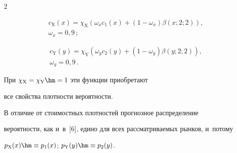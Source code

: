 \begin{multicols}{2}
  


  \vspace*{-5pt}


  


\noindent


  \begin{multline}


  c_{\mathrm{X}}(x)=\chi_{\mathrm{X}} \left( \omega_x c_1(x)+(1-


\omega_x)\beta(x;2;2)\right),\\[-0.5pt]


  \omega_x=0{,}9\,;


  \label{e22-ags}


  \end{multline}


  


  \vspace*{-14pt}


  


  \noindent


  \begin{multline}


  c_{\mathrm{Y}}(y)=\chi_{\mathrm{Y}} \left( \omega_y c_2(y)+(1-


\omega_y)\beta(y;2;2)\right),\\[-0.5pt]


  \omega_y=0{,}9\,.


  \label{e23-ags}


  \end{multline}


  


  \vspace*{-4pt}


  


  \noindent


При $\chi_{\mathrm{X}}=\chi_{\mathrm{Y}}\hm=1$ эти функции приобретают 


все свойства плотности вероятности. 


  


  В отличие от стоимостных плотностей про\-гноз\-ное распределение 


вероятности, как и~в~[6], едино для всех рассматриваемых рынков, и~потому


  $p_{\mathrm{X}}(x)\hm\equiv p_1(x)$; $p_{\mathrm{Y}}(y)\hm\equiv p_2(y)$. 



\end{multicols}
